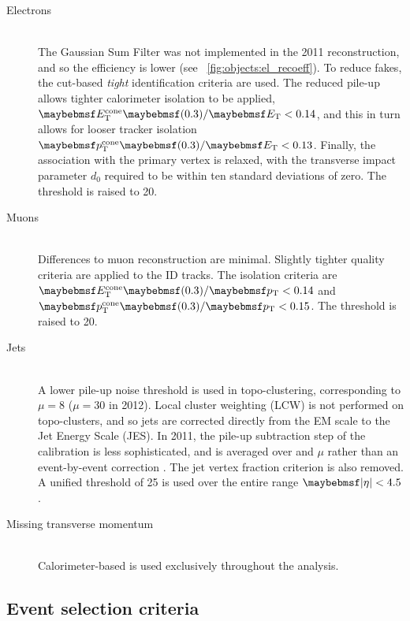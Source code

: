 \begin{description}
\item[Electrons] \hfill \\
	The Gaussian Sum Filter was not implemented in the 2011 reconstruction, and so the 
	efficiency is lower (see \Figure~\ref{fig:objects:el_recoeff}). To reduce fakes, the 
	cut-based \textit{tight} identification criteria are used. The reduced pile-up allows
	tighter calorimeter isolation to be applied, $\etcone{0.3}/\et < 0.14$, and this in 
	turn allows for looser tracker isolation $\ptcone{0.3}/\et < 0.13$. Finally, the 
	association with the primary vertex is relaxed, with the transverse impact parameter 
	$d_0$ required to be within ten standard deviations of zero. The \pt threshold is raised 
	to \unit{20}{\GeV}.

\item[Muons] \hfill \\
	Differences to muon reconstruction are minimal. Slightly tighter quality criteria are 
	applied to the ID tracks. The isolation criteria are $\etcone{0.3}/\pt < 0.14$ and 
	$\ptcone{0.3}/\pt < 0.15$. The \pt threshold is raised to \unit{20}{\GeV}.

\item[Jets] \hfill \\
	A lower pile-up noise threshold is used in topo-clustering, corresponding to 
	$\mu = 8$ (\cf $\mu = 30$ in 2012). Local cluster weighting (LCW) is not performed on 
	topo-clusters, and so jets are corrected directly from the EM scale to the Jet Energy 
	Scale (JES). In 2011, the pile-up subtraction step of the calibration is less 
	sophisticated, and is averaged over \npv and $\mu$ rather than an event-by-event 
	correction \cite{Jets:PileupCorrection:2011}. The jet vertex fraction criterion is also 
	removed. A unified \pt threshold of \unit{25}{\GeV} is used over the entire 
	range $\mods{\eta} < 4.5$.

\item[Missing transverse momentum] \hfill \\
	Calorimeter-based \met is used exclusively throughout the analysis.

\end{description}



\subsection{Event selection criteria}

